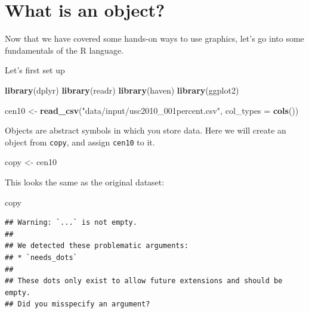 \documentclass[
]{book}
\newenvironment{Shaded}{\begin{snugshade}}{\end{snugshade}}
\newcommand{\DataTypeTok}[1]{\textcolor[rgb]{0.13,0.29,0.53}{#1}}
\newcommand{\KeywordTok}[1]{\textcolor[rgb]{0.13,0.29,0.53}{\textbf{#1}}}
\newcommand{\NormalTok}[1]{#1}
\newcommand{\StringTok}[1]{\textcolor[rgb]{0.31,0.60,0.02}{#1}}
\theoremstyle{definition}
\theoremstyle{definition}
\theoremstyle{definition}
\theoremstyle{definition}
\theoremstyle{remark}
\begin{document}
\hypertarget{what-is-an-object}{%
\section{What is an object?}\label{what-is-an-object}}

Now that we have covered some hands-on ways to use graphics, let's go into some fundamentals of the R language.

Let's first set up

\begin{Shaded}
\begin{Highlighting}[]
\KeywordTok{library}\NormalTok{(dplyr)}
\KeywordTok{library}\NormalTok{(readr)}
\KeywordTok{library}\NormalTok{(haven)}
\KeywordTok{library}\NormalTok{(ggplot2)}
\end{Highlighting}
\end{Shaded}

\begin{Shaded}
\begin{Highlighting}[]
\NormalTok{cen10 <-}\StringTok{ }\KeywordTok{read_csv}\NormalTok{(}\StringTok{"data/input/usc2010_001percent.csv"}\NormalTok{, }\DataTypeTok{col_types =} \KeywordTok{cols}\NormalTok{())}
\end{Highlighting}
\end{Shaded}

Objects are abstract symbols in which you store data. Here we will create an object from \texttt{copy}, and assign \texttt{cen10} to it.

\begin{Shaded}
\begin{Highlighting}[]
\NormalTok{copy <-}\StringTok{ }\NormalTok{cen10 }
\end{Highlighting}
\end{Shaded}

This looks the same as the original dataset:

\begin{Shaded}
\begin{Highlighting}[]
\NormalTok{copy}
\end{Highlighting}
\end{Shaded}

\begin{verbatim}
## Warning: `...` is not empty.
## 
## We detected these problematic arguments:
## * `needs_dots`
## 
## These dots only exist to allow future extensions and should be empty.
## Did you misspecify an argument?
\end{verbatim}
\end{document}
